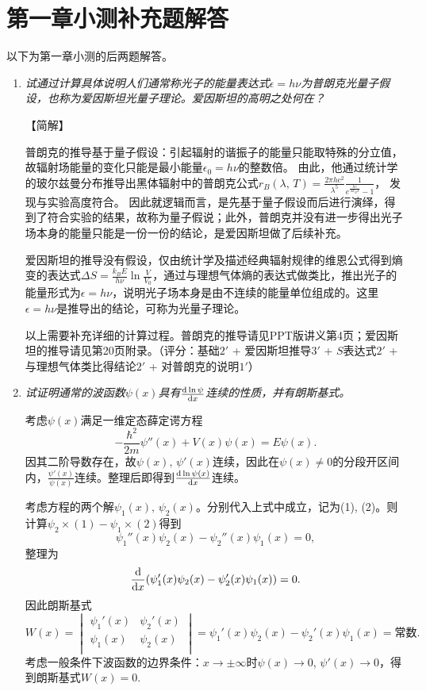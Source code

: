 \section{第一章小测补充题解答}
以下为第一章小测的后两题解答。

\begin{enumerate}[label=1.\Alph*, leftmargin=-0.5mm]
\item
\emph{试通过计算具体说明人们通常称光子的能量表达式$\epsilon=h\nu$为普朗克光量子假设，也称为爱因斯坦光量子理论。爱因斯坦的高明之处何在？}

【简解】

普朗克的推导基于量子假设：引起辐射的谐振子的能量只能取特殊的分立值，故辐射场能量的变化只能是最小能量$\epsilon_0=h\nu$的整数倍。
由此，他通过统计学的玻尔兹曼分布推导出黑体辐射中的普朗克公式$r_B(\lambda,\,T) = \frac{2\pi hc^2}{\lambda^5} \frac{1}{e^{\frac{hc}{\lambda k_B T}}-1}$，
发现与实验高度符合。
因此就逻辑而言，是先基于量子假设而后进行演绎，得到了符合实验的结果，故称为量子假说；此外，普朗克并没有进一步得出光子场本身的能量只能是一份一份的结论，是爱因斯坦做了后续补充。

爱因斯坦的推导没有假设，仅由统计学及描述经典辐射规律的维恩公式得到熵变的表达式$\Delta S=\frac{k_B E}{h\nu}\ln\frac{V}{V_0}$，通过与理想气体熵的表达式做类比，推出光子的能量形式为$\epsilon=h\nu$，说明光子场本身是由不连续的能量单位组成的。这里$\epsilon=h\nu$是推导出的结论，可称为光量子理论。

{\color{red}以上需要补充详细的计算过程。}普朗克的推导请见PPT版讲义第4页；爱因斯坦的推导请见第20页附录。（评分：基础$2'$ + 爱因斯坦推导$3'$ + $S$表达式$2'$ + 与理想气体类比得结论$2'$ + 对普朗克的说明$1'$）


\item
\emph{试证明通常的波函数$\psi(x)$具有$\dv{\ln\psi}{x}$连续的性质，并有朗斯基式。}

考虑$\psi(x)$满足一维定态薛定谔方程
\[-\frac{\hbar^2}{2m}\psi''(x) + V(x)\psi(x) = E\psi(x).\]
因其二阶导数存在，故$\psi(x),\,\psi'(x)$连续，因此在$\psi(x)\neq 0$的分段开区间内，$\frac{\psi'(x)}{\psi(x)}$连续。整理后即得到$\dv{\ln\psi(x)}{x}$连续。

考虑方程的两个解$\psi_1(x),\,\psi_2(x)$。分别代入上式中成立，记为(1), (2)。则计算$\psi_2\times(1)-\psi_1\times(2)$得到
\[\psi_1''(x)\psi_2(x) - \psi_2''(x)\psi_1(x) = 0,\]
整理为
\[\dv{x}(\psi_1'(x)\psi_2(x) - \psi_2'(x)\psi_1(x))=0.\]
因此朗斯基式
\[W(x) = 
\begin{vmatrix}
\psi_1'(x) & \psi_2'(x)\\
\psi_1(x) & \psi_2(x)\\
\end{vmatrix} = 
\psi_1'(x)\psi_2(x) - \psi_2'(x)\psi_1(x) = \text{常数}.\]
考虑一般条件下波函数的边界条件：$x\rightarrow \pm \infty$时$\psi(x)\rightarrow 0$, $\psi'(x)\rightarrow 0$，得到朗斯基式$W(x)=0$.


\end{enumerate}
